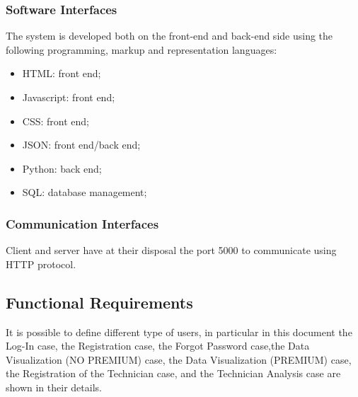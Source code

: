\documentclass{article}
\begin{document}
\subsubsection{Software Interfaces}
The system is developed both on the front-end and back-end side using the following programming, markup and representation languages:
\begin{itemize}
\item HTML: front end;
\item Javascript: front end;
\item CSS: front end;
\item JSON: front end/back end;
\item Python: back end;
\item SQL: database management;
\end{itemize}
\subsubsection{Communication Interfaces}
Client and server have at their disposal the port 5000 to communicate using HTTP protocol.

\subsection{Functional Requirements}
It is possible to define different type of users, in particular in this document the Log-In case, the Registration case, the Forgot Password case,the Data Visualization (NO PREMIUM) case, the Data Visualization (PREMIUM) case, the Registration of the Technician case, and the Technician Analysis case are shown in their details.
\end{document}
